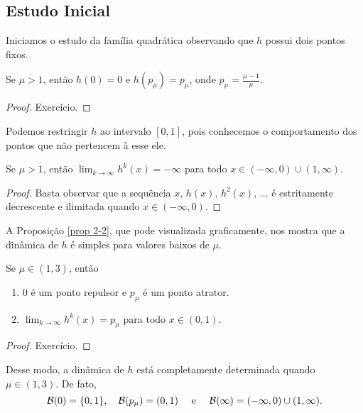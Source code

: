 \subsection{Estudo Inicial}

Iniciamos o estudo da família quadrática observando que $h$ possui dois pontos fixos.

\begin{proposition}
Se $\mu > 1$, então $h(0) = 0$ e $h(p_\mu) = p_\mu$, onde $p_\mu = \frac{\mu-1}{\mu}$.
\end{proposition}

\begin{proof}
Exercício.
\end{proof}

Podemos restringir $h$ ao intervalo $[0, 1]$, pois conhecemos o comportamento dos pontos que não pertencem à esse ele.

\begin{proposition}\label{prop 2-1}
Se $\mu > 1$, então $\lim_{k \to \infty} h^k(x) = - \infty$ para todo $x \in (-\infty, 0) \cup (1, \infty)$.
\end{proposition}

\begin{proof}
Basta observar que a sequência $x, \, h(x), \, h^2(x), \, \dots$ é estritamente decrescente e ilimitada quando $x \in (-\infty, 0)$.
\end{proof}

A Proposição \ref{prop 2-2}, que pode visualizada graficamente, nos mostra que a dinâmica de $h$ é simples para valores baixos de $\mu$.

\begin{proposition}\label{prop 2-2}
Se $\mu \in (1, 3)$, então
\begin{enumerate}
\item $0$ é um ponto repulsor e $p_\mu$ é um ponto atrator.
\item $\lim_{k \to \infty} h^k(x) = p_\mu$ para todo $x \in (0, 1)$.
\end{enumerate}
\end{proposition}

\begin{proof}
Exercício.
\end{proof}

Desse modo, a dinâmica de $h$ está completamente determinada quando $\mu \in (1, 3)$. De fato,
$$\mathcal{B}(0) = \lbrace 0, 1 \rbrace, \quad \mathcal{B}(p_\mu) = (0, 1) \quad \text{ e }  \quad \mathcal{B}(\infty) = (-\infty, 0) \cup (1, \infty).$$
